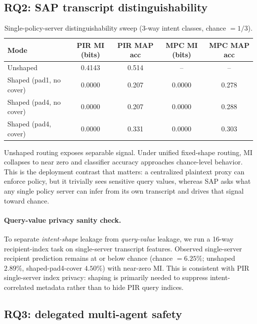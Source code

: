 \subsection{RQ2: SAP transcript distinguishability}
\label{sec:rq2}

\begin{table}[t]
\centering
\small
\begin{tabular}{lcccc}
\toprule
Mode & PIR MI (bits) & PIR MAP acc & MPC MI (bits) & MPC MAP acc \\
\midrule
Unshaped & 0.4143 & 0.514 & -- & -- \\
Shaped (pad1, no cover) & 0.0000 & 0.207 & 0.0000 & 0.278 \\
Shaped (pad4, no cover) & 0.0000 & 0.207 & 0.0000 & 0.288 \\
Shaped (pad4, cover) & 0.0000 & 0.331 & 0.0000 & 0.303 \\
\bottomrule
\end{tabular}
\caption{Single-policy-server distinguishability sweep (3-way intent classes, chance $=1/3$).}
\label{tab:sap-sweep}
\end{table}

Unshaped routing exposes separable signal.
Under unified fixed-shape routing, MI collapses to near zero and classifier accuracy approaches chance-level behavior.
This is the deployment contrast that matters: a centralized plaintext proxy can enforce policy, but it trivially sees sensitive query values, whereas SAP asks what any single policy server can infer from its own transcript and drives that signal toward chance.

\paragraph{Query-value privacy sanity check.}
To separate \emph{intent-shape} leakage from \emph{query-value} leakage, we run a 16-way recipient-index task on single-server transcript features.
Observed single-server recipient prediction remains at or below chance (chance $=6.25\%$; unshaped $2.89\%$, shaped-pad4-cover $4.50\%$) with near-zero MI.
This is consistent with PIR single-server index privacy: shaping is primarily needed to suppress intent-correlated metadata rather than to hide PIR query indices.

\subsection{RQ3: delegated multi-agent safety}
\label{sec:rq3}

